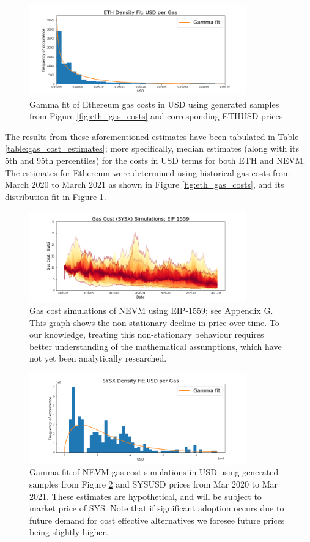 \documentclass[peerreview]{ieeesyscoin}
\begin{document}
\begin{figure}[h!]
\includegraphics[width=3.7in]{img/eth_usd_density.png}
\caption{Gamma fit of Ethereum gas costs in USD using generated samples from Figure \ref{fig:eth_gas_costs} and corresponding ETHUSD prices} 
\label{fig:eth_usd_density}
\end{figure} 

The results from these aforementioned estimates have been tabulated in Table \ref{table:gas_cost_estimates}; more specifically, median estimates (along with its 5th and 95th percentiles) for the costs in USD terms for both ETH and NEVM. The estimates for Ethereum were determined using historical gas costs from March 2020 to March 2021 as shown in Figure \ref{fig:eth_gas_costs}, and its distribution fit in Figure \ref{fig:eth_usd_density}.

\begin{figure}[h!]
\includegraphics[width=3.7in]{img/sysx_gas_costs_eip_1559.png}
\caption{Gas cost simulations of NEVM using EIP-1559; see Appendix G. This graph shows the non-stationary decline in price over time. To our knowledge, treating this non-stationary behaviour requires better understanding of the mathematical assumptions, which have not yet been analytically researched.} 
\label{fig:sysx_gas_costs_eip_1559}
\end{figure} 

\begin{figure}[h!]
\includegraphics[width=3.7in]{img/sysx_usd_density.png}
\caption{Gamma fit of NEVM gas cost simulations in USD using generated samples from Figure \ref{fig:sysx_gas_costs_eip_1559} and SYSUSD prices from Mar 2020 to Mar 2021. These estimates are hypothetical, and will be subject to market price of SYS. Note that if significant adoption occurs due to future demand for cost effective alternatives we foresee future prices being slightly higher.} 
\label{fig:sysx_usd_density}
\end{figure} 
\end{document}
